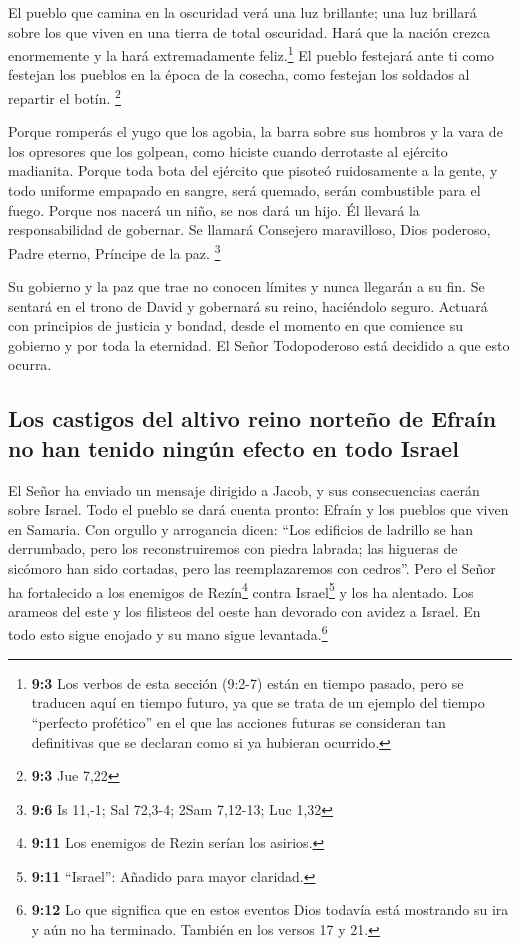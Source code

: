  El pueblo que camina en la oscuridad verá una luz
brillante; una luz brillará sobre los que viven en una tierra de total
oscuridad.  Hará que la nación crezca enormemente y la
hará extremadamente feliz.\footnote{\textbf{9:3} Los verbos de esta
  sección (9:2-7) están en tiempo pasado, pero se traducen aquí en
  tiempo futuro, ya que se trata de un ejemplo del tiempo ``perfecto
  profético'' en el que las acciones futuras se consideran tan
  definitivas que se declaran como si ya hubieran ocurrido.} El pueblo
festejará ante ti como festejan los pueblos en la época de la cosecha,
como festejan los soldados al repartir el botín. \footnote{\textbf{9:3}
  Jue 7,22}

 Porque romperás el yugo que los agobia, la barra sobre
sus hombros y la vara de los opresores que los golpean, como hiciste
cuando derrotaste al ejército madianita.  Porque toda bota
del ejército que pisoteó ruidosamente a la gente, y todo uniforme
empapado en sangre, será quemado, serán combustible para el fuego.
 Porque nos nacerá un niño, se nos dará un hijo. Él
llevará la responsabilidad de gobernar. Se llamará Consejero
maravilloso, Dios poderoso, Padre eterno, Príncipe de la paz.
\footnote{\textbf{9:6} Is 11,-1; Sal 72,3-4; 2Sam 7,12-13; Luc 1,32}

 Su gobierno y la paz que trae no conocen límites y nunca
llegarán a su fin. Se sentará en el trono de David y gobernará su reino,
haciéndolo seguro. Actuará con principios de justicia y bondad, desde el
momento en que comience su gobierno y por toda la eternidad. El Señor
Todopoderoso está decidido a que esto ocurra.

\hypertarget{los-castigos-del-altivo-reino-norteuxf1o-de-efrauxedn-no-han-tenido-ninguxfan-efecto-en-todo-israel}{%
\subsection{Los castigos del altivo reino norteño de Efraín no han
tenido ningún efecto en todo
Israel}\label{los-castigos-del-altivo-reino-norteuxf1o-de-efrauxedn-no-han-tenido-ninguxfan-efecto-en-todo-israel}}

 El Señor ha enviado un mensaje dirigido a Jacob, y sus
consecuencias caerán sobre Israel.  Todo el pueblo se dará
cuenta pronto: Efraín y los pueblos que viven en Samaria. Con orgullo y
arrogancia dicen:  ``Los edificios de ladrillo se han
derrumbado, pero los reconstruiremos con piedra labrada; las higueras de
sicómoro han sido cortadas, pero las reemplazaremos con cedros''.
 Pero el Señor ha fortalecido a los enemigos de
Rezín\footnote{\textbf{9:11} Los enemigos de Rezin serían los asirios.}
contra Israel\footnote{\textbf{9:11} ``Israel'': Añadido para mayor
  claridad.} y los ha alentado.  Los arameos del este y
los filisteos del oeste han devorado con avidez a Israel. En todo esto
sigue enojado y su mano sigue levantada.\footnote{\textbf{9:12} Lo que
  significa que en estos eventos Dios todavía está mostrando su ira y
  aún no ha terminado. También en los versos 17 y 21.}


